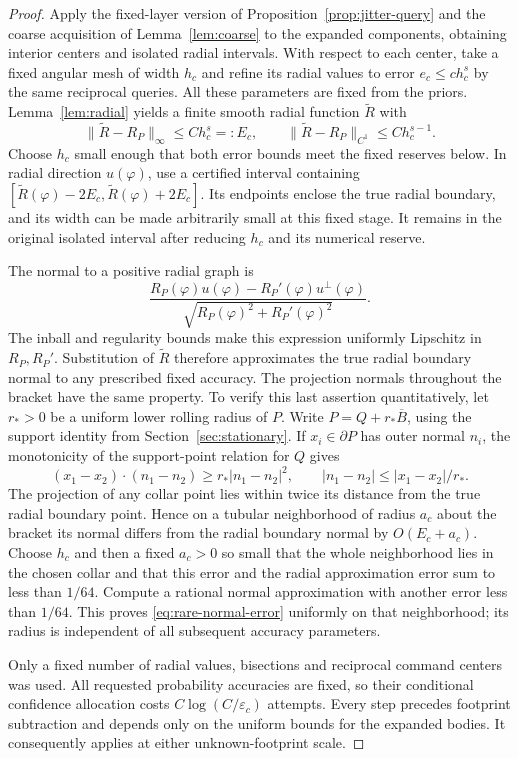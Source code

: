 \begin{proof}
Apply the fixed-layer version of Proposition~\ref{prop:jitter-query}
and the coarse acquisition of Lemma~\ref{lem:coarse} to the expanded
components, obtaining interior centers and isolated radial intervals.
With respect to each center, take a fixed angular mesh of width $h_c$
and refine its radial values to error $e_c\le c h_c^s$ by the same
reciprocal queries. All these parameters are fixed from the priors.
Lemma~\ref{lem:radial} yields a finite smooth radial function
$\widetilde R$ with
\[
 \|\widetilde R-R_P\|_\infty\le C h_c^s=:E_c,
 \qquad
 \|\widetilde R-R_P\|_{C^1}\le C h_c^{s-1}.
\]
Choose $h_c$ small enough that both error bounds meet the fixed
reserves below. In radial direction $u(\varphi)$, use a certified
interval containing
$[\widetilde R(\varphi)-2E_c,\widetilde R(\varphi)+2E_c]$.
Its endpoints enclose the true radial boundary, and its width can be
made arbitrarily small at this fixed stage. It remains in the original
isolated interval after reducing $h_c$ and its numerical reserve.

The normal to a positive radial graph is
\[
 \frac{R_P(\varphi)u(\varphi)
                 -R_P'(\varphi)u^\perp(\varphi)}
        {\sqrt{R_P(\varphi)^2+R_P'(\varphi)^2}}.
\]
The inball and regularity bounds make this expression uniformly
Lipschitz in $R_P,R_P'$. Substitution of $\widetilde R$ therefore
approximates the true radial boundary normal to any prescribed fixed
accuracy. The projection normals throughout the bracket have the same
property. To verify this last assertion quantitatively, let $r_*>0$
be a uniform lower rolling radius of $P$. Write $P=Q+r_*\overline B$,
using the support identity from Section~\ref{sec:stationary}. If
$x_i\in\partial P$ has outer normal $n_i$, the monotonicity of the
support-point relation for $Q$ gives
\[
 (x_1-x_2)\cdot(n_1-n_2)\ge r_*|n_1-n_2|^2,
 \qquad |n_1-n_2|\le |x_1-x_2|/r_*.
\]
The projection of any collar point lies within twice its distance
from the true radial boundary point. Hence on a tubular neighborhood
of radius $a_c$ about the bracket its normal differs from the radial
boundary normal by $O(E_c+a_c)$. Choose $h_c$ and then a fixed
$a_c>0$ so small that the whole neighborhood lies in the chosen collar
and that this error and the radial approximation error sum to less
than $1/64$. Compute a rational normal approximation with another
error less than $1/64$. This proves \eqref{eq:rare-normal-error}
uniformly on that neighborhood; its radius is independent of all
subsequent accuracy parameters.

Only a fixed number of radial values, bisections and reciprocal command
centers was used. All requested probability accuracies are fixed, so
their conditional confidence allocation costs
$C\log(C/\varepsilon_c)$ attempts. Every step precedes footprint
subtraction and depends only on the uniform bounds for the expanded
bodies. It consequently applies at either unknown-footprint scale.
\end{proof}


